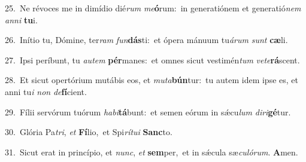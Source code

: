 {\numbfont\textcolor{\numbcolor}{25.}}~Ne révoces me in dimídio dié\textit{rum} \textit{me}\-\textbf{ó}rum:~\star in generatiónem et generatió\textit{nem} \textit{an}\-\textit{ni} \textbf{tu}\-i.\par
{\numbfont\textcolor{\numbcolor}{26.}}~Inítio tu, Dómine, ter\textit{ram} \textit{fun}\-\textbf{dás}ti:~\star et ópera mánuum tu\-\textit{á}\-\textit{rum} \textit{sunt} \textbf{cæ}\-li.\par
{\numbfont\textcolor{\numbcolor}{27.}}~Ipsi períbunt, tu \textit{au}\-\textit{tem} \textbf{pér}\-manes:~\star et omnes sicut vestimén\textit{tum} \textit{ve}\-\textit{te}\textbf{rá}scent.\par
{\numbfont\textcolor{\numbcolor}{28.}}~Et sicut opertórium mutábis eos, et \textit{mu}\-\textit{ta}\textbf{bún}tur:~\star tu autem idem ipse es, et anni tu\textit{i} \textit{non} \textit{de}\-\textbf{fí}cient.\par
{\numbfont\textcolor{\numbcolor}{29.}}~Fílii servórum tuórum \textit{ha}\-\textit{bi}\textbf{tá}bunt:~\star et semen eórum in sǽcu\textit{lum} \textit{di}\-\textit{ri}\textbf{gé}tur.\par
{\numbfont\textcolor{\numbcolor}{30.}}~Glória Pa\-\textit{tri}\-, \textit{et} \textbf{Fí}\-lio,~\star et Spi\-\textit{rí}\-\textit{tu}\textit{i} \textbf{Sanc}\-to.\par
{\numbfont\textcolor{\numbcolor}{31.}}~Sicut erat in princípio, et \textit{nunc}\-, \textit{et} \textbf{sem}\-per,~\star et in sǽcula sæ\-\textit{cu}\-\textit{ló}\textit{rum}. \textbf{A}\-men.\par

